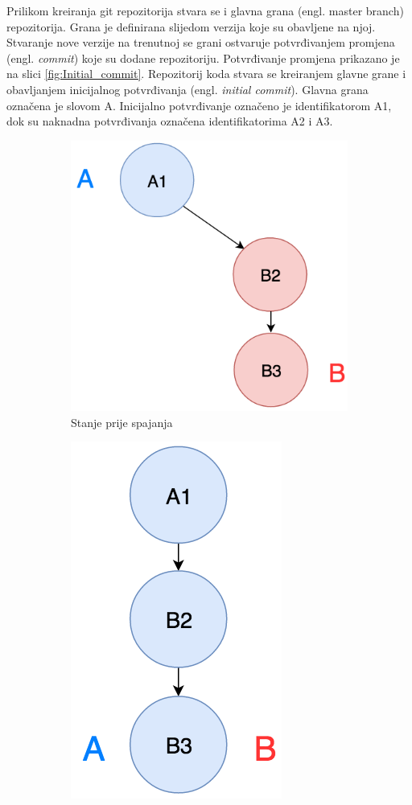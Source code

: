 \documentclass[times, utf8, diplomski, numeric]{fer}
\newcommand{\eng}[1]{(engl. \textit{#1})}
\begin{document}
Prilikom kreiranja git repozitorija stvara se i glavna grana (engl. master branch) repozitorija. Grana je definirana slijedom verzija koje su obavljene na njoj. Stvaranje nove verzije na trenutnoj se grani ostvaruje potvrđivanjem promjena \eng{commit} koje su dodane repozitoriju. Potvrđivanje promjena prikazano je na slici \ref{fig:Initial_commit}. Repozitorij koda stvara se kreiranjem glavne grane i obavljanjem inicijalnog potvrđivanja \eng{initial commit}. Glavna grana označena je slovom A. Inicijalno potvrđivanje označeno je identifikatorom A1, dok su naknadna potvrđivanja označena identifikatorima A2 i A3.

\begin{figure}
\centering
\begin{subfigure}{.49\textwidth}
\centering
\includegraphics[scale=0.6]{FastForwardA}
\caption{Stanje prije spajanja}
\label{fig:FastForwardA}
\end{subfigure}
\begin{subfigure}{.49\textwidth}
\centering
\includegraphics[scale=0.6]{FastForwardB}

\end{subfigure}
\end{figure}
\end{document}
